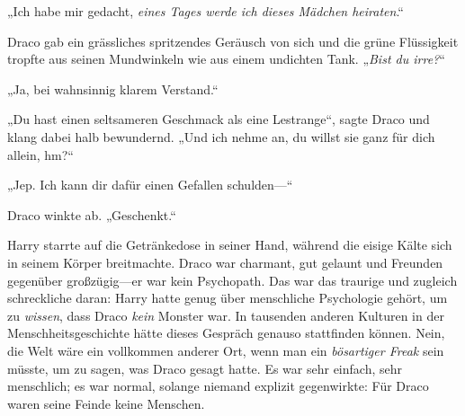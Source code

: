 „Ich habe mir gedacht, \emph{eines Tages werde ich dieses Mädchen heiraten}.“

Draco gab ein grässliches spritzendes Geräusch von sich und die grüne Flüssigkeit tropfte aus seinen Mundwinkeln wie aus einem undichten Tank. „\emph{Bist du irre?}“

„Ja, bei wahnsinnig klarem Verstand.“

„Du hast einen seltsameren Geschmack als eine Lestrange“, sagte Draco und klang dabei halb bewundernd. „Und ich nehme an, du willst sie ganz für dich allein, hm?“

„Jep. Ich kann dir dafür einen Gefallen schulden—“

Draco winkte ab. „Geschenkt.“

Harry starrte auf die Getränkedose in seiner Hand, während die eisige Kälte sich in seinem Körper breitmachte. Draco war charmant, gut gelaunt und Freunden gegenüber großzügig—er war kein Psychopath. Das war das traurige und zugleich schreckliche daran: Harry hatte genug über menschliche Psychologie gehört, um zu \emph{wissen}, dass Draco \emph{kein} Monster war. In tausenden anderen Kulturen in der Menschheitsgeschichte hätte dieses Gespräch genauso stattfinden können. Nein, die Welt wäre ein vollkommen anderer Ort, wenn man ein \emph{bösartiger Freak} sein müsste, um zu sagen, was Draco gesagt hatte. Es war sehr einfach, sehr menschlich; es war normal, solange niemand explizit gegenwirkte: Für Draco waren seine Feinde keine Menschen.

